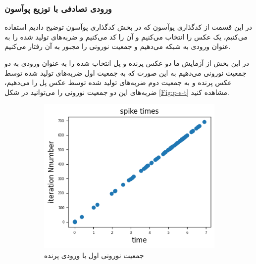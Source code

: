 \documentclass[12pt]{article}
\begin{document}
\subsubsection{ورودی تصادفی با توزیع پوآسون}
در این قسمت از کدگذاری پوآسون که در بخش کدگذاری پوآسون توضیح دادیم استفاده می‌کنیم، یک عکس را انتخاب می‌کنیم و آن را کد می‌کنیم و ضربه‌های تولید شده را به عنوان ورودی به شبکه می‌دهیم و جمعیت نورونی را مجبور به آن رفتار می‌کنیم.

در این بخش از آزمایش ما دو عکس پرنده و پل انتخاب شده را به عنوان ورودی به دو جمعیت نورونی می‌دهیم به این صورت که به جمعیت اول ضربه‌های تولید شده توسط عکس پرنده و به جمعیت دوم ضربه‌های تولید شده توسط عکس پل را می‌دهیم، ضربه‌های این دو جمعیت نورونی را می‌توانید در شکل \ref{Fig:p-s-t} مشاهده کنید.


\begin{figure}[H]
\centering
  \begin{subfigure}[b]{0.30\textwidth}
    \includegraphics[width=\textwidth]{Figs/s-t-bird.png}
    \caption{جمعیت نورونی اول با ورودی پرنده}
  \end{subfigure}
  \hspace*{40}
  \begin{subfigure}[b]{0.30\textwidth}

\end{subfigure}
\end{figure}
\end{document}
